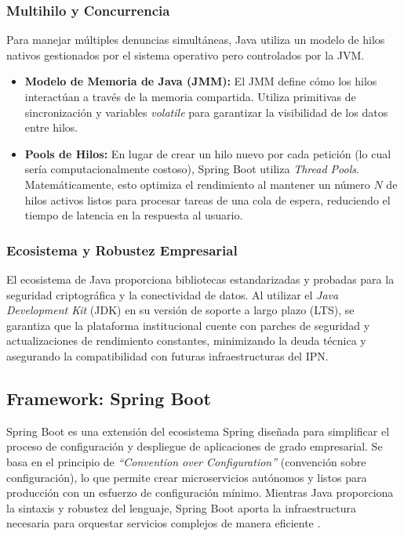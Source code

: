 \subsubsection{Multihilo y Concurrencia}
Para manejar múltiples denuncias simultáneas, Java utiliza un modelo de hilos nativos gestionados por el sistema operativo pero controlados por la JVM.
\begin{itemize}
\item \textbf{Modelo de Memoria de Java (JMM):} El JMM define cómo los hilos interactúan a través de la memoria compartida. Utiliza primitivas de sincronización y variables \textit{volatile} para garantizar la visibilidad de los datos entre hilos.
\item \textbf{Pools de Hilos:} En lugar de crear un hilo nuevo por cada petición (lo cual sería computacionalmente costoso), Spring Boot utiliza \textit{Thread Pools}. Matemáticamente, esto optimiza el rendimiento al mantener un número $N$ de hilos activos listos para procesar tareas de una cola de espera, reduciendo el tiempo de latencia en la respuesta al usuario.
\end{itemize}

\subsubsection{Ecosistema y Robustez Empresarial}
El ecosistema de Java proporciona bibliotecas estandarizadas y probadas para la seguridad criptográfica y la conectividad de datos. Al utilizar el \textit{Java Development Kit} (JDK) en su versión de soporte a largo plazo (LTS), se garantiza que la plataforma institucional cuente con parches de seguridad y actualizaciones de rendimiento constantes, minimizando la deuda técnica y asegurando la compatibilidad con futuras infraestructuras del IPN.

\subsection{Framework: Spring Boot}

Spring Boot es una extensión del ecosistema Spring diseñada para simplificar el proceso de configuración y despliegue de aplicaciones de grado empresarial. Se basa en el principio de \textit{“Convention over Configuration”} (convención sobre configuración), lo que permite crear microservicios autónomos y listos para producción con un esfuerzo de configuración mínimo. Mientras Java proporciona la sintaxis y robustez del lenguaje, Spring Boot aporta la infraestructura necesaria para orquestar servicios complejos de manera eficiente \cite{38} .

